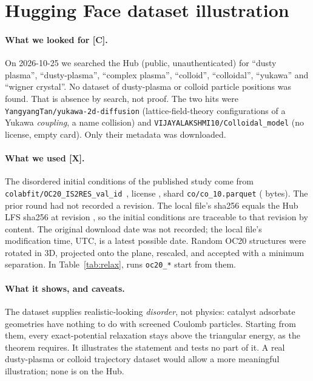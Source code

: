 \documentclass[11pt]{article}
\theoremstyle{remark}
\newcommand{\tier}[1]{\textbf{[#1]}}
\begin{document}
\section{Hugging Face dataset illustration}\label{sec:hf}

\paragraph{What we looked for \tier{C}.} On 2026-10-25 we searched the Hub (public, unauthenticated) for ``dusty
plasma'', ``dusty-plasma'', ``complex plasma'', ``colloid'', ``colloidal'', ``yukawa'' and ``wigner crystal''. No
dataset of dusty-plasma or colloid particle positions was found. That is absence by search, not proof. The two hits were
\texttt{YangyangTan/yukawa-2d-diffusion} (lattice-field-theory configurations of a Yukawa \emph{coupling}, a name
collision) and \texttt{VIJAYALAKSHMI10/Colloidal\_model} (no license, empty card). Only their metadata was downloaded.

\paragraph{What we used \tier{X}.} The disordered initial conditions of the published study come from
\texttt{colabfit/OC20\_IS2RES\_val\_id}~\cite{oc20}, license \OcLicense{}, shard \texttt{co/co\_10.parquet}
(\OcBytes{} bytes). The prior round had not recorded a revision. The local file's sha256 \texttt{\OcSha} equals the Hub
LFS sha256 at revision \texttt{\OcRev}, so the initial conditions are traceable to that revision by content. The
original download date was not recorded; the local file's modification time, \OcMtime{} UTC, is a latest possible
date. Random OC20 structures were rotated in 3D, projected onto the plane, rescaled, and
accepted with a minimum separation. In Table~\ref{tab:relax}, runs \texttt{oc20\_*} start from them.

\paragraph{What it shows, and caveats.} The dataset supplies realistic-looking \emph{disorder}, not physics: catalyst
adsorbate geometries have nothing to do with screened Coulomb particles. Starting from them, every exact-potential
relaxation stays above the triangular energy, as the theorem requires. It illustrates the statement and tests no
part of it. A real dusty-plasma or colloid trajectory dataset would allow a more meaningful illustration; none is
on the Hub.
\end{document}
